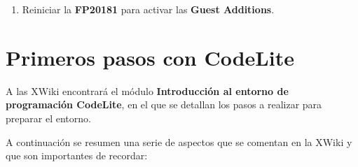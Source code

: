 \documentclass[
]{book}
\providecommand{\tightlist}{%
  \setlength{\itemsep}{0pt}\setlength{\parskip}{0pt}}
\begin{document}
\begin{enumerate}
\def\labelenumi{\arabic{enumi}.}
\tightlist
\item
  Reiniciar la \textbf{FP20181} para activar las \textbf{Guest Additions}.
\end{enumerate}

\hypertarget{primeros-pasos-con-codelite}{%
\section{Primeros pasos con CodeLite}\label{primeros-pasos-con-codelite}}

A las XWiki encontrará el módulo \textbf{Introducción al entorno de programación CodeLite}, en el que se detallan los pasos a realizar para preparar el entorno.

A continuación se resumen una serie de aspectos que se comentan en la XWiki y que son importantes de recordar:
\end{document}
